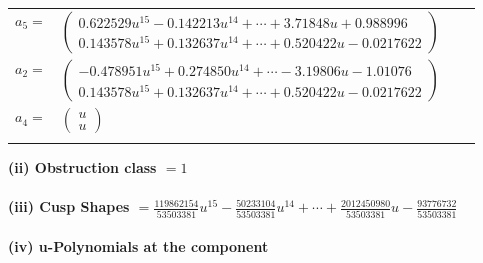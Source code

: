 \documentclass[1p]{elsarticle_modified}
\theoremstyle{definition}
\begin{document}
\begin{tabular}{m{7pt} m{180pt} m{7pt} m{180pt} }
\flushright $a_{5}=$&$\begin{pmatrix}0.622529 u^{15}-0.142213 u^{14}+\cdots+3.71848 u+0.988996\\0.143578 u^{15}+0.132637 u^{14}+\cdots+0.520422 u-0.0217622\end{pmatrix}$ \\
\flushright $a_{2}=$&$\begin{pmatrix}-0.478951 u^{15}+0.274850 u^{14}+\cdots-3.19806 u-1.01076\\0.143578 u^{15}+0.132637 u^{14}+\cdots+0.520422 u-0.0217622\end{pmatrix}$ \\
\flushright $a_{4}=$&$\begin{pmatrix}u\\u\end{pmatrix}$\\&\end{tabular}
\flushleft \textbf{(ii) Obstruction class $= 1$}\\~\\
\flushleft \textbf{(iii) Cusp Shapes $= \frac{119862154}{53503381} u^{15}-\frac{50233104}{53503381} u^{14}+\cdots+\frac{2012450980}{53503381} u-\frac{93776732}{53503381}$}\\~\\
\newpage\renewcommand{\arraystretch}{1}
\flushleft \textbf{(iv) u-Polynomials at the component}\newline \\
\end{document}
